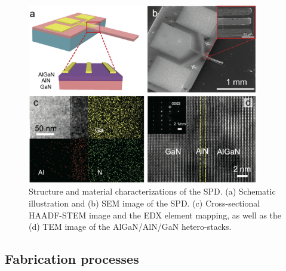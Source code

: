 \begin{figure}[H] 
\centering    
\includegraphics[width=0.9\textwidth]{ch3_structure}
\caption[Structure and material characterizations of the SPD]{Structure and material characterizations of the  SPD. (a) Schematic illustration and (b) SEM image of the SPD. (c) Cross-sectional HAADF-STEM image and the EDX element mapping, as well as the (d) TEM image of the AlGaN/AlN/GaN hetero-stacks.}
\label{fig3:structure}
\end{figure}


\subsection{Fabrication processes}
\label{sec:Fabrication processes chapter3}

